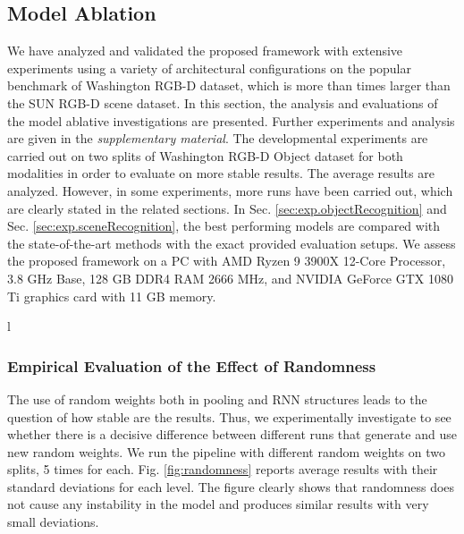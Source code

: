 \subsection{Model Ablation} \label{sec:exp.modelAblation}
\begin{figure*}[!ht]
	\centering
	\caption{Effect of randomness on the accuracy results for each level (L1 to L7). Values indicate standard deviations.}
	\label{fig:randomness}
\end{figure*}
We have analyzed and validated the proposed framework with extensive experiments using a variety of architectural configurations on the popular benchmark of Washington RGB-D dataset, which is more than  times larger than the SUN RGB-D scene dataset. In this section, the analysis and evaluations of the model ablative investigations are presented. Further experiments and analysis are given in the \textit{supplementary material}. The developmental experiments are carried out on two splits of Washington RGB-D Object dataset for both modalities in order to evaluate on more stable results. The average results are analyzed. However, in some experiments, more runs have been carried out, which are clearly stated in the related sections. In Sec. \ref{sec:exp.objectRecognition} and Sec. \ref{sec:exp.sceneRecognition}, the best performing models are compared with the state-of-the-art methods with the exact provided evaluation setups. We assess the proposed framework on a PC with AMD Ryzen 9 3900X 12-Core Processor, 3.8 GHz Base, 128 GB DDR4 RAM 2666 MHz, and NVIDIA GeForce GTX 1080 Ti graphics card with 11 GB memory.
\begin{figure*}[!b]
	\centering
	 l	\caption{Level-wise average accuracy performance of different baseline models on all the 10-splits of Washington RGB-D dataset.}
	\label{fig:levelwisePerformances}
\end{figure*}
\subsubsection{Empirical Evaluation of the Effect of Randomness}
\label{sec.exp.ma.randomness}
The use of random weights both in pooling and RNN structures leads to the question of how stable are the results. Thus, we experimentally investigate to see whether there is a decisive difference between different runs that generate and use new random weights. We run the pipeline with different random weights on two splits, 5 times for each. Fig. \ref{fig:randomness} reports average results with their standard deviations for each level. The figure clearly shows that randomness does not cause any instability in the model and produces similar results with very small deviations.

